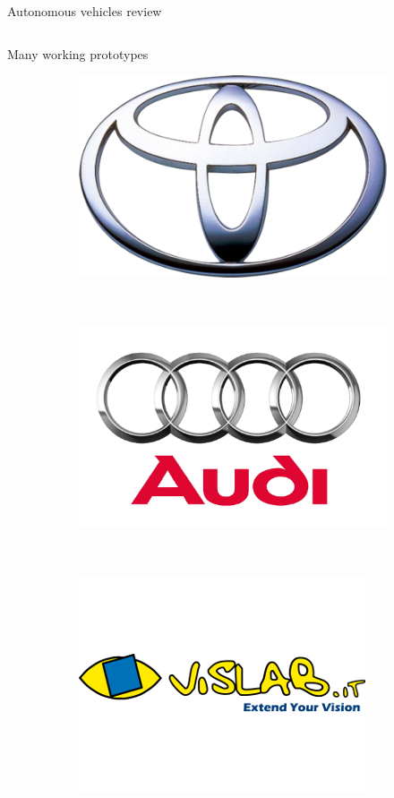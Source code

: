 \begin{frame}{Autonomous vehicles review}
\begin{columns}[T]
\begin{center}
\begin{overlayarea}{\textwidth}{\textheight}
{\begin{block}{Many working prototypes}
\begin{figure}[t]
\begin{subfigure}[b]{0.2\textwidth}
		\includegraphics[width=\textwidth]{toyota}
	      \end{subfigure}
	      ~
	      \begin{subfigure}[b]{0.2\textwidth}
		\includegraphics[width=\textwidth]{audi}
	      \end{subfigure}
	      ~
	      \begin{subfigure}[b]{0.2\textwidth}
		\includegraphics[width=\textwidth]{vislab_logo}

\end{subfigure}
\end{figure}
\end{block}}
\end{overlayarea}
\end{center}
\end{columns}
\end{frame}
